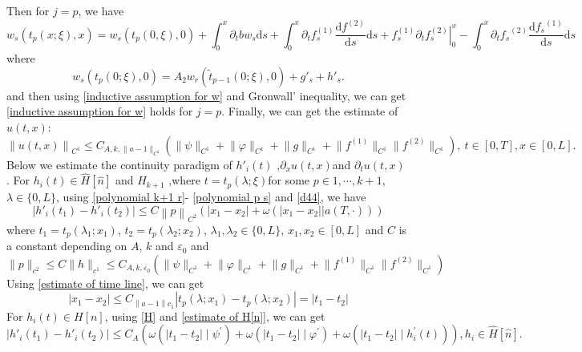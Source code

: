 \documentclass[a4paper,reqno,11pt]{amsart}
\numberwithin{equation}{section} %
\begin{document}
Then for $j=p$, we have
\begin{equation}\label{e of w_s p}
	w_s\left( t_p(x;\xi ),x \right) =w_s(t_p(0,\xi ),0)+\int_{0}^x{\partial _tbw_s\mathrm{d}s}+\int_{0}^x{\partial _tf_{s}^{(1)}\frac{\mathrm{d}f^{(2)}}{\mathrm{d}s}\mathrm{d}s}+\left. f_{s}^{(1)}\partial _tf_{s}^{(2)} \right|_{0}^{x}-\int_{0}^x{\partial _t{f_s}^{(2)}\frac{\mathrm{d}{f_s}^{(1)}}{\mathrm{d}s}\mathrm{d}s}
\end{equation}
where
\begin{equation}\label{w_s at t_p(t,0)}
	w_s(t_p(0 ; \xi), 0)= A_2 w_r\left(\tilde{t}_{p-1}(0 ; \xi), 0\right)+g'_s+h'_s .
\end{equation}
and then using \eqref{inductive assumption for w} and Gronwall' inequality, we can get \eqref{inductive assumption for w} holds for $j=p$.
Finally, we can get the estimate of $u(t,x)$:
\begin{equation}\label{estimate of u}
	\left\| u(t,x) \right\|_{C^1} \leq C_{A,k,\lVert a-1 \rVert _{C^1}}(\lVert \psi \rVert _{C^1}+\lVert \varphi  \rVert _{C^1}+  \lVert g \rVert _{C^1}+\lVert f^{(1)} \rVert _{C^1}\lVert f^{(2)} \rVert _{C^1}) ,\ t\in [0,T], x\in [0,L].
\end{equation}
Below we estimate the continuity paradigm of  $h'_i(t) $ ,$\partial _x u(t,x)$and  $\partial _t u(t,x)$ .
For $h_i(t) \in \hat{H}\left[ \hat{n} \right] $ and $H_{k+1}$ ,where $t=t_p(\lambda;\xi)$for some $p \in 1,\cdots , k+1$, $\lambda \in \{ 0,L \} $, using \eqref{polynomial k+1 r}- \eqref{polynomial p s} and \eqref{d44}, we have
$$
\left|h'_i\left(t_1\right)-h'_i\left(t_2\right)\right| \leqslant C\left\| p\right\|_{C^2}(\left|x_1-x_2\right|+ \omega (\left|x_1-x_2\right|  | a(T,\cdot)))
$$
where $t_1=t_p(\lambda _1;x _1)$, $t_2=t_p(\lambda _2;x _2)$, $\lambda _1,\lambda _2 \in \{ 0,L \} $, $x _1,x _2 \in [0,L]$ and $C$ is a constant depending on $A$, $k$ and $\varepsilon _0$ and
$$
\|p\|_{c^2} \leqslant C\|h\|_{c^1} \leqslant C_{A,k,\varepsilon _0}(\lVert \psi \rVert _{C^1}+\lVert \varphi  \rVert _{C^1}+  \lVert g \rVert _{C^1}+\lVert f^{(1)} \rVert _{C^1}\lVert f^{(2)} \rVert _{C^1}) 
$$
Using \eqref{estimate of time line}, we can get
$$
\left| x_1-x_2 \right|\le C_{\left\| a-1 \right\| c_1}\left| t_p\left( \lambda ;x_1 \right) -t_p\left( \lambda ;x_2 \right) \right|=\left| t_1-t_2 \right|
$$
For $h_i(t) \in H\left[ n \right] $, using \eqref{H} and \eqref{estimate of H[n]}, we can get
$$
\left|h'_i\left(t_1\right)-h'_i\left(t_2\right)\right| \leqslant C_A(\omega \left(\left|t_1-t_2\right| \mid \psi^{\prime}\right)+\omega \left(\left|t_1-t_2\right| \mid \varphi^{\prime}\right)+\omega \left(\left|t_1-t_2\right| \mid h_i^{\prime}(t)\right)),h_i \in \hat{H}\left[ \hat{n} \right] .
$$
\end{document}
